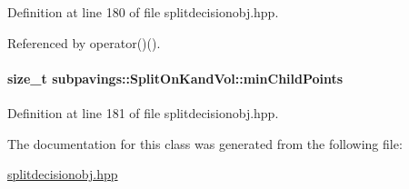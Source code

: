 \-Definition at line 180 of file splitdecisionobj.\-hpp.



\-Referenced by operator()().

\hypertarget{classsubpavings_1_1SplitOnKandVol_af590d181521aea9eacec7465312cb735}{
\paragraph[{min\-Child\-Points}]{\setlength{\rightskip}{0pt plus 5cm}size\-\_\-t {\bf subpavings\-::\-Split\-On\-Kand\-Vol\-::min\-Child\-Points}}}\label{classsubpavings_1_1SplitOnKandVol_af590d181521aea9eacec7465312cb735}


\-Definition at line 181 of file splitdecisionobj.\-hpp.



\-The documentation for this class was generated from the following file\-:\begin{DoxyCompactItemize}
\item 
\hyperlink{splitdecisionobj_8hpp}{splitdecisionobj.\-hpp}\end{DoxyCompactItemize}
